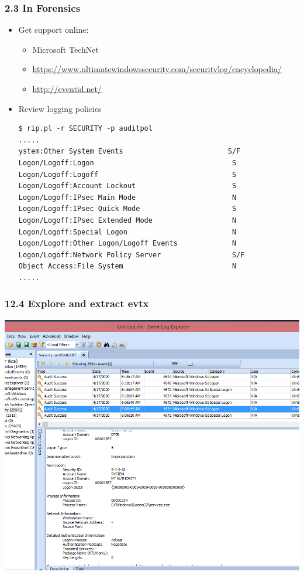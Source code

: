 \begin{frame}[fragile]
  \frametitle{2.3 In Forensics}
    \begin{itemize}
        \item Get support online:
            \begin{itemize}
                \item Microsoft TechNet
		\item \url{https://www.ultimatewindowssecurity.com/securitylog/encyclopedia/}
		\item \url{http://eventid.net/}
            \end{itemize}
        \item Review logging policies
  \begin{lstlisting}[basicstyle=\tiny]
$ rip.pl -r SECURITY -p auditpol
.....
ystem:Other System Events                         S/F  
Logon/Logoff:Logon                                 S    
Logon/Logoff:Logoff                                S    
Logon/Logoff:Account Lockout                       S    
Logon/Logoff:IPsec Main Mode                       N    
Logon/Logoff:IPsec Quick Mode                      S    
Logon/Logoff:IPsec Extended Mode                   N    
Logon/Logoff:Special Logon                         N    
Logon/Logoff:Other Logon/Logoff Events             N    
Logon/Logoff:Network Policy Server                 S/F  
Object Access:File System                          N    
.....
  \end{lstlisting}
    \end{itemize}
\end{frame}


\begin{frame}[fragile]
  \frametitle{12.4 Explore and extract evtx}
    \includegraphics[scale=0.27]{images/evtx2.png}
\end{frame}


